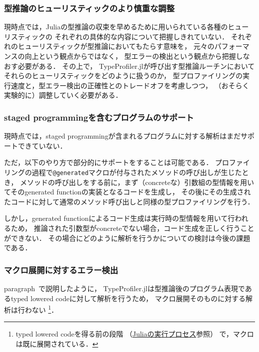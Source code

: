 \subsubsection{型推論のヒューリスティックのより慎重な調整}

現時点では，Juliaの型推論の収束を早めるために用いられている各種のヒューリスティックの
それぞれの具体的な内容について把握しきれていない．
それぞれのヒューリスティックが型推論においてもたらす意味を，
元々のパフォーマンスの向上という観点からではなく，
型エラーの検出という観点から把握しなおす必要がある．
その上で，
TypeProfiler.jlが呼び出す型推論ルーチンにおいてそれらのヒューリスティックをどのように扱うのか，
型プロファイリングの実行速度と，型エラー検出の正確性とのトレードオフを考慮しつつ，
（おそらく実験的に）調整していく必要がある．

\subsubsection{staged programmingを含むプログラムのサポート}

現時点では，staged programmingが含まれるプログラムに対する解析はまだサポートできていない．

ただ，以下のやり方で部分的にサポートをすることは可能である．
プロファイリングの過程で\verb|@generated|マクロが付与されたメソッドの呼び出しが生じたとき，
メソッドの呼び出しをする前に，まず（concreteな）引数組の型情報を用いてそのgenerated functionの実装となるコードを生成し，
その後にその生成されたコードに対して通常のメソッド呼び出しと同様の型プロファイリングを行う．

しかし，generated functionによるコード生成は実行時の型情報を用いて行われるため，
推論された引数型がconcreteでない場合，コード生成を正しく行うことができない．
その場合にどのように解析を行うかについての検討は今後の課題である．

\subsubsection{マクロ展開に対するエラー検出}

paragraph~\label{paragraph:type-profiler-basic-implementation}で説明したように，
TypeProfiler.jlは型推論後のプログラム表現であるtyped lowered codeに対して解析を行うため，
マクロ展開そのものに対する解析は行わない
\footnote{
  typed lowered codeを得る前の段階
  （\hyperref[subsubsection:eval-process]{Juliaの実行プロセス}参照）
  で，マクロは既に展開されている．
}．

